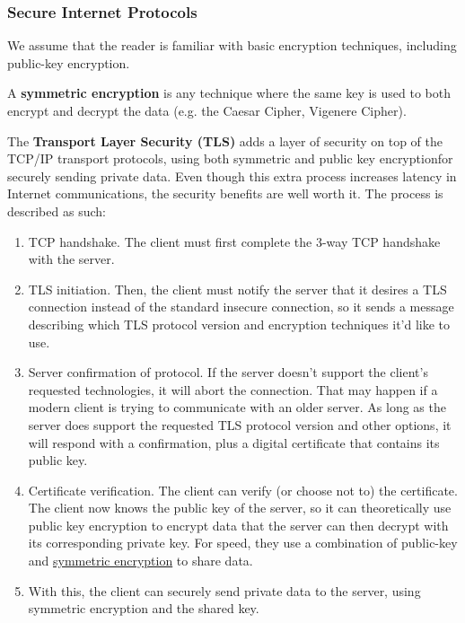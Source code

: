 \documentclass{article}
\newcounter{definition}[section]
\begin{document}
  \subsubsection{Secure Internet Protocols}
  We assume that the reader is familiar with basic encryption techniques, including public-key encryption. 

  \begin{definition}
    \label{def:symmetric-encryption}
  A \textbf{symmetric encryption} is any technique where the same key is used to both encrypt and decrypt the data (e.g. the Caesar Cipher, Vigenere Cipher). 
  \end{definition}

  The \textbf{Transport Layer Security (TLS)} adds a layer of security on top of the TCP/IP transport protocols, using both symmetric and public key encryptionfor securely sending private data. Even though this extra process increases latency in Internet communications, the security benefits are well worth it. The process is described as such: 
  \begin{enumerate}
      \item TCP handshake. The client must first complete the 3-way TCP handshake with the server. 
      \item TLS initiation. Then, the client must notify the server that it desires a TLS connection instead of the standard insecure connection, so it sends a message describing which TLS protocol version and encryption techniques it'd like to use. 
      \item Server confirmation of protocol. If the server doesn't support the client's requested technologies, it will abort the connection. That may happen if a modern client is trying to communicate with an older server. As long as the server does support the requested TLS protocol version and other options, it will respond with a confirmation, plus a digital certificate that contains its public key. 
      \item Certificate verification. The client can verify (or choose not to) the certificate. The client now knows the public key of the server, so it can theoretically use public key encryption to encrypt data that the server can then decrypt with its corresponding private key. For speed, they use a combination of public-key and \hyperref[def:symmetric-encryption]{symmetric encryption} to share data.
      \item With this, the client can securely send private data to the server, using symmetric encryption and the shared key. 
  \end{enumerate}
\end{document}
